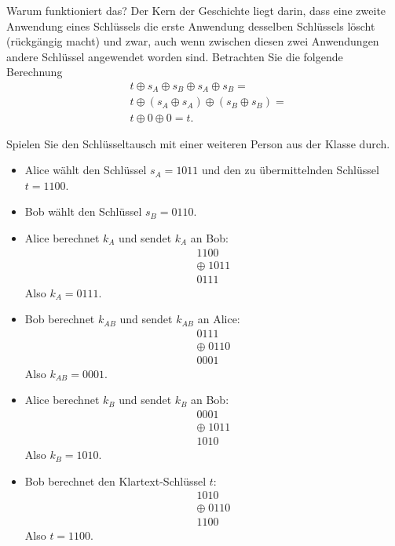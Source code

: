 \noindent
Warum funktioniert das? Der Kern der Geschichte liegt darin, dass eine zweite Anwendung eines Schlüssels die erste Anwendung desselben Schlüssels löscht (rückgängig macht) und
zwar, auch wenn zwischen diesen zwei Anwendungen andere Schlüssel angewendet worden sind. Betrachten Sie die folgende Berechnung
\begin{align*}
	 & t\oplus s_A \oplus s_B\oplus s_A\oplus s_B =    \\
	 & t\oplus (s_A\oplus s_A)\oplus (s_B\oplus s_B) = \\
	 & t\oplus 0\oplus 0 = t.
\end{align*}

\begin{myexercise}
	Spielen Sie den Schlüsseltausch mit einer weiteren Person aus der Klasse durch.
	\begin{myanswer}
		\begin{itemize}
			\item Alice wählt den Schlüssel $s_A = 1011$ und den zu übermittelnden Schlüssel $t = 1100$.
			\item Bob wählt den Schlüssel $s_B = 0110$.
			\item Alice berechnet $k_A$ und sendet $k_A$ an Bob:
			      \[
				      \begin{array}{r}
					      1100         \\
					      \oplus\;1011 \\
					      \hline
					      0111
				      \end{array}
			      \]
			      Also $k_A = 0111$.
			\item Bob berechnet $k_{AB}$ und sendet $k_{AB}$ an Alice:
			      \[
				      \begin{array}{r}
					      0111         \\
					      \oplus\;0110 \\
					      \hline
					      0001
				      \end{array}
			      \]
			      Also $k_{AB} = 0001$.
			\item Alice berechnet $k_B$ und sendet $k_B$ an Bob:
			      \[
				      \begin{array}{r}
					      0001         \\
					      \oplus\;1011 \\
					      \hline
					      1010
				      \end{array}
			      \]
			      Also $k_B = 1010$.
			\item Bob berechnet den Klartext-Schlüssel $t$:
			      \[
				      \begin{array}{r}
					      1010         \\
					      \oplus\;0110 \\
					      \hline
					      1100
				      \end{array}
			      \]
			      Also $t = 1100$.
		\end{itemize}
	\end{myanswer}
\end{myexercise}


